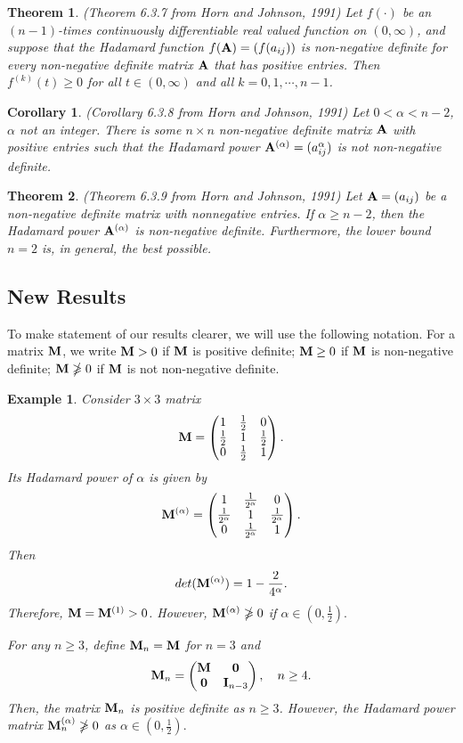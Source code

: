 \documentclass[conference,letterpaper]{IEEEtran}
\numberwithin{equation}{section}
\newcommand{\lbl}{\label}
\newcommand{\bd}{\bold}
\newcommand{\beaa}{\begin{eqnarray*}}
\newcommand{\eeaa}{\end{eqnarray*}}
\newtheorem{theorem}{{\sc Theorem}}[section]
\newtheorem{coro}{{\sc Corollary}}[section]
\newtheorem{example}{{\sc Example}}[section]
\begin{document}
\begin{theorem} (Theorem 6.3.7 from Horn and Johnson, 1991)
	Let $f(\cdot)$ be an $(n-1)$-times continuously differentiable real valued function on $(0,\infty)$, and suppose that the Hadamard function $f(\bd{A})=(f(a_{ij}))$ is non-negative definite for every non-negative definite matrix $\bd{A}$ that has positive entries. Then $f^{(k)}(t)\geq 0$ for all $t\in(0,\infty)$ and all $k=0,1,\cdots,n-1$.
\end{theorem}
\begin{coro}(Corollary 6.3.8 from Horn and Johnson, 1991)
	Let $0<\alpha<n-2$, $\alpha$ not an integer. There is some $n\times n$ non-negative definite matrix $\bd{A}$ with positive entries such that the Hadamard power $\bd{A}^{(\alpha)}=(a_{ij}^\alpha)$ is not non-negative definite.
\end{coro}
\begin{theorem} (Theorem 6.3.9 from Horn and Johnson, 1991)
	Let $\bd{A}=(a_{ij})$ be a non-negative definite matrix with nonnegative entries. If $\alpha \geq n-2$, then the Hadamard power $\bd{A}^{(\alpha)}$ is non-negative definite. Furthermore, the lower bound $n=2$ is, in general, the best possible.
\end{theorem}


\subsection{New Results}\lbl{Section_main}
To make statement of our results clearer, we will use the following notation.  For a matrix $\bd{M}$, we write $\bd{M}>0$ if $\bd{M}$ is positive definite; $\bd{M}\geq 0$ if $\bd{M}$ is non-negative definite; $\bd{M}\ngeqslant 0$ if $\bd{M}$ is not  non-negative definite.


\begin{example} Consider  $3\times 3$ matrix
\beaa
\bd{M}=
\begin{pmatrix}
1 & \frac{1}{2} & 0\\
\frac{1}{2} & 1 & \frac{1}{2}\\
0 & \frac{1}{2} & 1
\end{pmatrix}
.
\eeaa
Its Hadamard power of $\alpha$ is given by
\beaa
\bd{M}^{(\alpha)}=
\begin{pmatrix}
1 & \frac{1}{2^{\alpha}} & 0\\
\frac{1}{2^{\alpha}} & 1 & \frac{1}{2^{\alpha}}\\
0 & \frac{1}{2^{\alpha}} & 1
\end{pmatrix}
.
\eeaa
 Then
\beaa
\mbox{det}(\bd{M}^{(\alpha)})=1-\frac{2}{4^{\alpha}}.
\eeaa
Therefore, $\bd{M}=\bd{M}^{(1)}>0$. However, $\bd{M}^{(\alpha)}\ngeqslant 0$ if $\alpha \in (0, \frac{1}{2}).$

For any $n\geq 3$, define $\bd{M}_n=\bd{M}$ for $n=3$ and
\beaa
\bd{M}_n=
\begin{pmatrix}
\bd{M} & \bd{0}\\
\bd{0} & \bd{I}_{n-3}
\end{pmatrix}
,\ \ \ n\geq 4.
\eeaa
Then,  the matrix $\bd{M}_n$ is positive definite as $n\geq 3$. However, the Hadamard power matrix $\bd{M}_n^{(\alpha)}\ngeqslant 0$  as $\alpha \in (0, \frac{1}{2}).$
\end{example}
\end{document}
